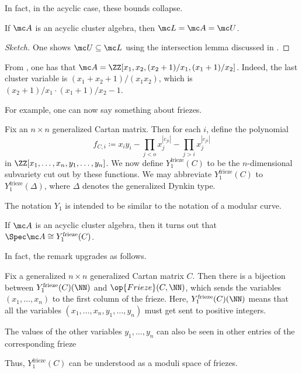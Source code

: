 \documentclass[../notes.tex]{subfiles}
\begin{document}
In fact, in the acyclic case, these bounds collapse.
\begin{theorem}
	If $\mc A$ is an acyclic cluster algebra, then $\mc L=\mc A=\mc U$.
\end{theorem}
\begin{proof}[Sketch]
	One shows $\mc U\subseteq\mc L$ using the intersection lemma discussed in .
\end{proof}
\begin{example}
	From , one has that $\mc A=\ZZ[x_1,x_2,(x_2+1)/x_1,(x_1+1)/x_2]$. Indeed, the last cluster variable is $(x_1+x_2+1)/(x_1x_2)$, which is $(x_2+1)/x_1\cdot(x_1+1)/x_2-1$.
\end{example}
For example, one can now say something about friezes.
\begin{definition}
	Fix an $n\times n$ generalized Cartan matrix. Then for each $i$, define the polynomial
	\[f_{C,i}\coloneqq x_iy_i-\prod_{j<o}x_j^{\left|c_{ji}\right|}-\prod_{j>i}x_j^{\left|c_{ji}\right|}\]
	in $\ZZ[x_1,\ldots,x_n,y_1,\ldots,y_n]$. We now define $Y_1^{\mathrm{frieze}}(C)$ to be the $n$-dimensional subvariety cut out by these functions. We may abbreviate $Y_1^{\mathrm{frieze}}(C)$ to $Y_1^{\mathrm{frieze}}(\Delta)$, where $\Delta$ denotes the generalized Dynkin type.
\end{definition}
\begin{remark}
	The notation $Y_1$ is intended to be similar to the notation of a modular curve.
\end{remark}
\begin{remark}
	If $\mc A$ is an acyclic cluster algebra, then it turns out that $\Spec\mc A\cong Y_1^{\mathrm{frieze}}(C)$.
\end{remark}
In fact, the remark upgrades as follows.
\begin{theorem}
	Fix a generalized $n\times n$ generalized Cartan matrix $C$. Then there is a bijection between $Y_1^{\mathrm{frieze}}(C)(\NN)$ and $\op{Frieze}(C,\NN)$, which sends the variables $(x_1,\ldots,x_n)$ to the first column of the frieze. Here, $Y_1^{\mathrm{frieze}}(C)(\NN)$ means that all the variables $(x_1,\ldots,x_n,y_1,\ldots,y_n)$ must get sent to positive integers.
\end{theorem}
\begin{remark}
	The values of the other variables $y_1,\ldots,y_n$ can also be seen in other entries of the corresponding frieze
\end{remark}
Thus, $Y_1^{\mathrm{frieze}}(C)$ can be understood as a moduli space of friezes.
\end{document}
